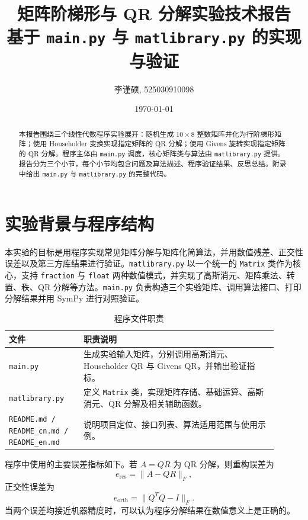 \documentclass[UTF8,zihao=-4]{ctexart}
\title{\vspace{-1.2cm}\textbf{矩阵阶梯形与 QR 分解实验技术报告}\\[0.4em]
\large 基于 \texttt{main.py} 与 \texttt{matlibrary.py} 的实现与验证}
\author{李谨硕, 525030910098}
\date{\today}
\begin{document}
\maketitle
\thispagestyle{fancy}

\begin{abstract}
本报告围绕三个线性代数程序实验展开：随机生成 $10\times 8$ 整数矩阵并化为行阶梯形矩阵；使用 Householder 变换实现指定矩阵的 QR 分解；使用 Givens 旋转实现指定矩阵的 QR 分解。程序主体由 \texttt{main.py} 调度，核心矩阵类与算法由 \texttt{matlibrary.py} 提供。报告分为三个小节，每个小节均包含问题及算法描述、程序验证结果、反思总结。附录中给出 \texttt{main.py} 与 \texttt{matlibrary.py} 的完整代码。
\end{abstract}

\tableofcontents
\newpage

\section{实验背景与程序结构}

本实验的目标是用程序实现常见矩阵分解与矩阵化简算法，并用数值残差、正交性误差以及第三方库结果进行验证。\texttt{matlibrary.py} 以一个统一的 \texttt{Matrix} 类作为核心，支持 \texttt{fraction} 与 \texttt{float} 两种数值模式，并实现了高斯消元、矩阵乘法、转置、秩、QR 分解等方法。\texttt{main.py} 负责构造三个实验矩阵、调用算法接口、打印分解结果并用 SymPy 进行对照验证。

\begin{table}[H]
\centering
\caption{程序文件职责}
\begin{tabular}{p{0.25\linewidth}p{0.65\linewidth}}
\toprule
文件 & 职责说明 \\
\midrule
\texttt{main.py} & 生成实验输入矩阵，分别调用高斯消元、Householder QR 与 Givens QR，并输出验证指标。\\
\texttt{matlibrary.py} & 定义 \texttt{Matrix} 类，实现矩阵存储、基础运算、高斯消元、QR 分解及相关辅助函数。\\
\texttt{README.md / README\_cn.md / README\_en.md} & 说明项目定位、接口列表、算法适用范围与使用示例。\\
\bottomrule
\end{tabular}
\end{table}

程序中使用的主要误差指标如下。若 $A=QR$ 为 QR 分解，则重构误差为
\[
    e_{\mathrm{res}}=\|A-QR\|_F,
\]
正交性误差为
\[
    e_{\mathrm{orth}}=\|Q^TQ-I\|_F.
\]
当两个误差均接近机器精度时，可以认为程序分解结果在数值意义上是正确的。
\end{document}

